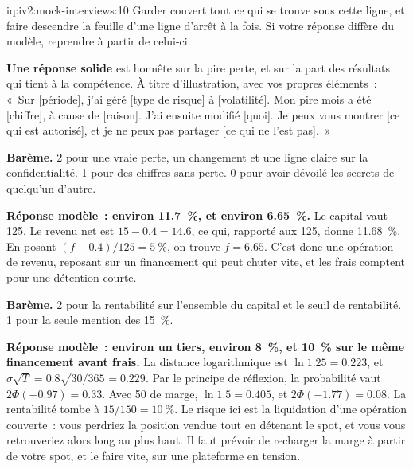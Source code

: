 \begin{solution}{iq:iv2:mock-interviews:10}
Garder couvert tout ce qui se trouve sous cette ligne, et faire descendre la feuille d'une ligne d'arrêt à la fois. Si votre réponse diffère du modèle, reprendre à partir de celui-ci.

\ivstop
\textbf{Une réponse solide} est honnête sur la pire perte, et sur la part des résultats qui tient à la compétence. À titre d'illustration, avec vos propres éléments~: «~Sur [période], j'ai géré [type de risque] à [volatilité]. Mon pire mois a été [chiffre], à cause de [raison]. J'ai ensuite modifié [quoi]. Je peux vous montrer [ce qui est autorisé], et je ne peux pas partager [ce qui ne l'est pas].~»

\textbf{Barème.} 2 pour une vraie perte, un changement et une ligne claire sur la confidentialité. 1 pour des chiffres sans perte. 0 pour avoir dévoilé les secrets de quelqu'un d'autre.

\ivstop
\textbf{Réponse modèle~: environ 11.7~\%, et environ 6.65~\%.} Le capital vaut 125. Le revenu net est $15 - 0.4 = 14.6$, ce qui, rapporté aux 125, donne 11.68~\%. En posant $(f - 0.4)/125 = 5~\%$, on trouve $f = 6.65$. C'est donc une opération de revenu, reposant sur un financement qui peut chuter vite, et les frais comptent pour une détention courte.

\textbf{Barème.} 2 pour la rentabilité sur l'ensemble du capital et le seuil de rentabilité. 1 pour la seule mention des 15~\%.

\ivstop
\textbf{Réponse modèle~: environ un tiers, environ 8~\%, et 10~\% sur le même financement avant frais.} La distance logarithmique est $\ln 1.25 = 0.223$, et $\sigma\sqrt{T} = 0.8\sqrt{30/365} = 0.229$. Par le principe de réflexion, la probabilité vaut $2\Phi(-0.97) = 0.33$. Avec 50 de marge, $\ln 1.5 = 0.405$, et $2\Phi(-1.77) = 0.08$. La rentabilité tombe à $15/150 = 10~\%$. Le risque ici est la liquidation d'une opération couverte~: vous perdriez la position vendue tout en détenant le spot, et vous vous retrouveriez alors long au plus haut. Il faut prévoir de recharger la marge à partir de votre spot, et le faire vite, sur une plateforme en tension.


\end{solution}
